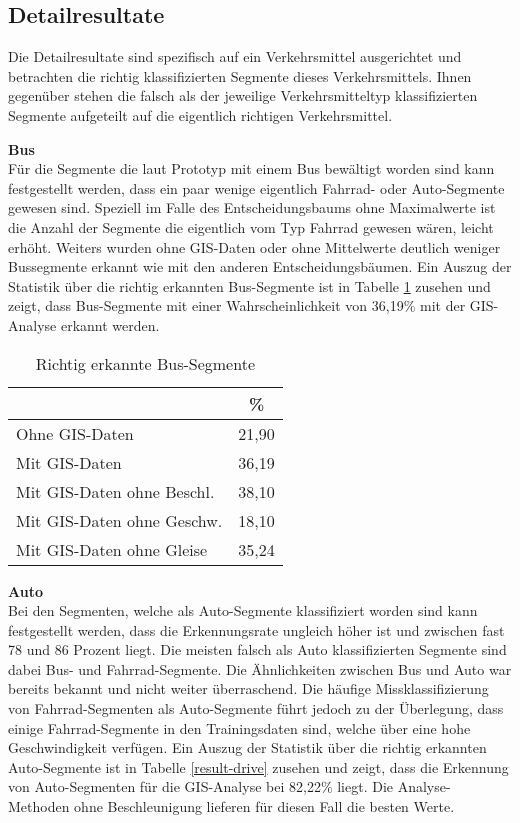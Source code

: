 \subsection{Detailresultate}
Die Detailresultate sind spezifisch auf ein Verkehrsmittel ausgerichtet und betrachten die richtig klassifizierten Segmente dieses Verkehrsmittels. Ihnen gegenüber stehen die falsch als der jeweilige Verkehrsmitteltyp klassifizierten Segmente aufgeteilt auf die eigentlich richtigen Verkehrsmittel.

\textbf{Bus} \\
Für die Segmente die laut Prototyp mit einem Bus bewältigt worden sind kann festgestellt werden, dass ein paar wenige eigentlich Fahrrad- oder Auto-Segmente gewesen sind. Speziell im Falle des Entscheidungsbaums ohne Maximalwerte ist die Anzahl der Segmente die eigentlich vom Typ Fahrrad gewesen wären, leicht erhöht. Weiters wurden ohne GIS-Daten oder ohne Mittelwerte deutlich weniger Bussegmente erkannt wie mit den anderen Entscheidungsbäumen. Ein Auszug der Statistik über die richtig erkannten Bus-Segmente ist in Tabelle \ref{result-bus} zusehen und zeigt, dass Bus-Segmente mit einer Wahrscheinlichkeit von 36,19\% mit der GIS-Analyse erkannt werden.

\begin{table}[h]
\centering
\begin{tabular}{|l|c|}
\hline
 & \% \\ \hline
Ohne GIS-Daten & 21,90 \\ \hline
Mit GIS-Daten & 36,19 \\ \hline
Mit GIS-Daten ohne Beschl. & 38,10 \\ \hline
Mit GIS-Daten ohne Geschw. & 18,10 \\ \hline
Mit GIS-Daten ohne Gleise & 35,24 \\ \hline
\end{tabular}
\caption{Richtig erkannte Bus-Segmente}
\label{result-bus}
\end{table}

\textbf{Auto} \\
Bei den Segmenten, welche als Auto-Segmente klassifiziert worden sind kann festgestellt werden, dass die Erkennungsrate ungleich höher ist und zwischen fast 78 und 86 Prozent liegt. Die meisten falsch als Auto klassifizierten Segmente sind dabei Bus- und Fahrrad-Segmente. Die Ähnlichkeiten zwischen Bus und Auto war bereits bekannt und nicht weiter überraschend. Die häufige Missklassifizierung von Fahrrad-Segmenten als Auto-Segmente führt jedoch zu der Überlegung, dass einige Fahrrad-Segmente in den Trainingsdaten sind, welche über eine hohe Geschwindigkeit verfügen. Ein Auszug der Statistik über die richtig erkannten Auto-Segmente ist in Tabelle \ref{result-drive} zusehen und zeigt, dass die Erkennung von Auto-Segmenten für die GIS-Analyse bei 82,22\% liegt. Die Analyse-Methoden ohne Beschleunigung lieferen für diesen Fall die besten Werte.

